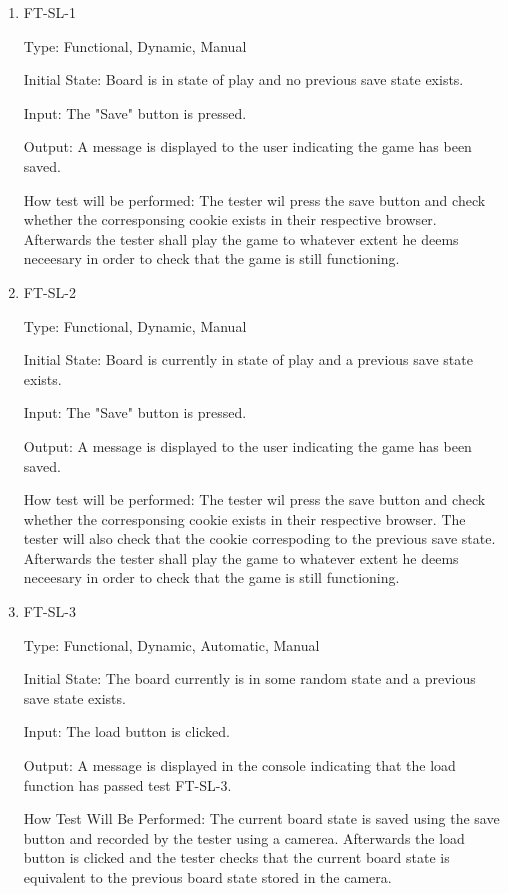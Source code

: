 \documentclass[12pt, titlepage]{article}
\begin{document}
\begin{enumerate}

	\item FT-SL-1

	      Type: Functional, Dynamic, Manual

	      Initial State: Board is in state of play and no previous save state exists.

	      Input: The "Save" button is pressed.

	      Output: A message is displayed to the user indicating the game has been saved.

	      How test will be performed:  The tester wil press the save button and check whether the corresponsing cookie exists in their respective browser. Afterwards the tester shall play the game to whatever extent he deems neceesary in order to check that  the game is still functioning.

	\item FT-SL-2

	      Type: Functional, Dynamic, Manual

	      Initial State:  Board is currently in state of play and a previous save state exists.

	      Input: The "Save" button is pressed.

	      Output: A message is displayed to the user indicating the game has been saved.

	      How test will be performed:   The tester wil press the save button and check whether the corresponsing cookie exists in their respective browser. The tester will also check that the cookie correspoding to the previous save state. Afterwards the tester shall play the game to whatever extent he deems neceesary in order to check that  the game is still functioning.


	\item FT-SL-3

	      Type: Functional, Dynamic, Automatic, {\color {blue} Manual}

	      Initial State: The board currently is in some random state and a previous save state exists.

	      Input:{\color {blue} The load button is clicked.}

	      Output: A message is displayed in the console indicating that the load function has passed test FT-SL-3.

	      How Test Will Be Performed: {\color {blue} The current board state is saved using the save button and recorded by the tester using a camerea. Afterwards the load button is clicked and the tester checks that the current board state is equivalent to the previous board state stored in the camera.}



\end{enumerate}
\end{document}
